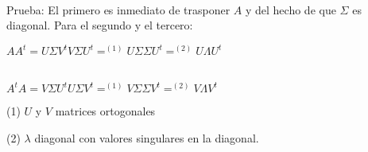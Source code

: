 \ \\
Prueba: El primero es inmediato de trasponer $A$ y del hecho de que $\Sigma$ es diagonal. Para el
segundo y el tercero:
\begin{center}
$A A^t = U \Sigma V^t V \Sigma U^t =^{(1)} U \Sigma \Sigma U^t =^{(2)} U \Lambda U^t$

\ \\
$A^t A = V \Sigma U^t U \Sigma V^t =^{(1)} V \Sigma \Sigma V^t =^{(2)} V \Lambda V^t$
\end{center}

(1) $U$ y $V$ matrices ortogonales

(2) $\lambda$ diagonal con valores singulares en la diagonal.


